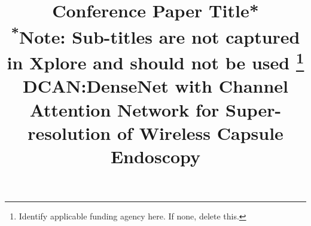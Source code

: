 \documentclass[conference]{IEEEtran}
\begin{document}
\title{Conference Paper Title*\\
{\footnotesize \textsuperscript{*}Note: Sub-titles are not captured in Xplore and
should not be used}
\thanks{Identify applicable funding agency here. If none, delete this.}
}

\title{DCAN:DenseNet with Channel Attention Network for Super-resolution of Wireless Capsule Endoscopy}
\maketitle
\end{document}
